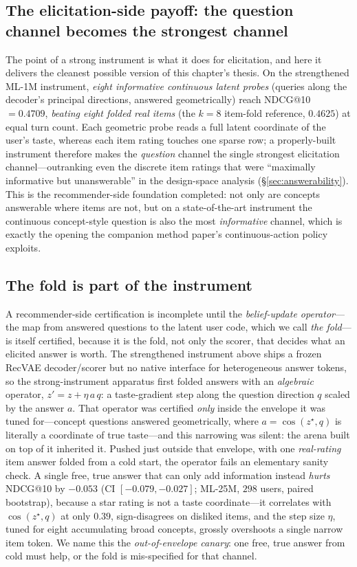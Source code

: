 \documentclass[11pt]{article}
\begin{document}
\subsection{The elicitation-side payoff: the question channel becomes the strongest channel}\label{sec:i2payoff}
The point of a strong instrument is what it does for elicitation, and here it delivers the cleanest possible version of
this chapter's thesis. On the strengthened ML-1M instrument, \emph{eight informative continuous latent probes} (queries
along the decoder's principal directions, answered geometrically) reach NDCG@10 $=0.4709$, \emph{beating eight folded
real items} (the $k{=}8$ item-fold reference, $0.4625$) at equal turn count. Each geometric probe reads a full latent
coordinate of the user's taste, whereas each item rating touches one sparse row; a properly-built instrument therefore
makes the \emph{question} channel the single strongest elicitation channel---outranking even the discrete item ratings
that were ``maximally informative but unanswerable'' in the design-space analysis (\S\ref{sec:answerability}). This is
the recommender-side foundation completed: not only are concepts answerable where items are not, but on a
state-of-the-art instrument the continuous concept-style question is also the most \emph{informative} channel, which is
exactly the opening the companion method paper's continuous-action policy exploits.

\subsection{The fold is part of the instrument}\label{sec:i2fold}
A recommender-side certification is incomplete until the \emph{belief-update operator}---the map from
answered questions to the latent user code, which we call \emph{the fold}---is itself certified, because it
is the fold, not only the scorer, that decides what an elicited answer is worth. The strengthened
instrument above ships a frozen RecVAE decoder/scorer but no native interface for heterogeneous answer
tokens, so the strong-instrument apparatus first folded answers with an \emph{algebraic} operator,
$z' = z + \eta\,a\,q$: a taste-gradient step along the question direction $q$ scaled by the answer $a$.
That operator was certified \emph{only} inside the envelope it was tuned for---concept questions answered
geometrically, where $a=\cos(z^\star,q)$ is literally a coordinate of true taste---and this narrowing was
silent: the arena built on top of it inherited it. Pushed just outside that envelope, with one
\emph{real-rating} item answer folded from a cold start, the operator fails an elementary sanity check. A
single free, true answer that can only add information instead \emph{hurts} NDCG@10 by $-0.053$
(CI $[-0.079,-0.027]$; ML-25M, $298$ users, paired bootstrap), because a star rating is not a taste
coordinate---it correlates with $\cos(z^\star,q)$ at only $0.39$, sign-disagrees on disliked items, and the
step size $\eta$, tuned for eight accumulating broad concepts, grossly overshoots a single narrow item
token. We name this the \emph{out-of-envelope canary}: one free, true answer from cold must help, or the
fold is mis-specified for that channel.
\end{document}
